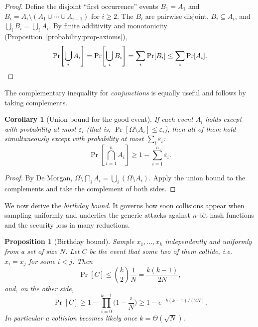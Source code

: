 \documentclass[11pt,a4paper]{article}
\newtheorem{proposition}[theorem]{Proposition}
\newtheorem{corollary}[theorem]{Corollary}
\theoremstyle{definition}
\theoremstyle{remark}
\begin{document}
\begin{proof}
Define the disjoint ``first occurrence'' events \(B_1 = A_1\) and \(B_i = A_i \setminus (A_1 \cup \cdots \cup A_{i-1})\) for \(i \ge 2\). The \(B_i\) are pairwise disjoint, \(B_i \subseteq A_i\), and \(\bigcup_i B_i = \bigcup_i A_i\). By finite additivity and monotonicity (Proposition~\ref{probability:prop-axioms}),
\[
\Pr\!\left[\bigcup_i A_i\right] = \Pr\!\left[\bigcup_i B_i\right] = \sum_i \Pr[B_i] \le \sum_i \Pr[A_i]. \qedhere
\]
\end{proof}

The complementary inequality for \emph{conjunctions} is equally useful and follows by taking complements.

\begin{corollary}[Union bound for the good event]\label{probability:cor-union}
If each event \(A_i\) holds except with probability at most \(\varepsilon_i\) (that is, \(\Pr[\Omega \setminus A_i] \le \varepsilon_i\)), then all of them hold simultaneously except with probability at most \(\sum_i \varepsilon_i\):
\[
\Pr\!\left[\bigcap_{i=1}^n A_i\right] \ge 1 - \sum_{i=1}^n \varepsilon_i.
\]
\end{corollary}

\begin{proof}
By De Morgan, \(\Omega \setminus \bigcap_i A_i = \bigcup_i (\Omega \setminus A_i)\). Apply the union bound to the complements and take the complement of both sides.
\end{proof}

We now derive the \emph{birthday bound}. It governs how soon collisions appear when sampling uniformly and underlies the generic attacks against \(n\)-bit hash functions and the security loss in many reductions.

\begin{proposition}[Birthday bound]\label{probability:prop-birthday}
Sample \(x_1, \dots, x_k\) independently and uniformly from a set of size \(N\). Let \(C\) be the event that some two of them collide, i.e.\ \(x_i = x_j\) for some \(i < j\). Then
\[
\Pr[C] \le \binom{k}{2}\frac{1}{N} = \frac{k(k-1)}{2N},
\]
and, on the other side,
\[
\Pr[C] \ge 1 - \prod_{i=0}^{k-1}\Big(1 - \frac{i}{N}\Big) \ge 1 - e^{-k(k-1)/(2N)} .
\]
In particular a collision becomes likely once \(k = \Theta(\sqrt{N})\).
\end{proposition}
\end{document}
